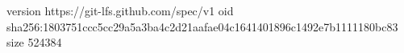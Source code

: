 version https://git-lfs.github.com/spec/v1
oid sha256:1803751ccc5cc29a5a3ba4c2d21aafae04c1641401896c1492e7b1111180bc83
size 524384
